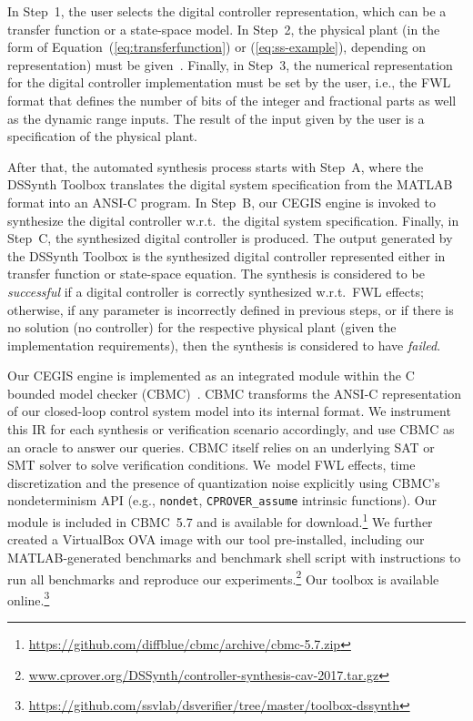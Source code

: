 \documentclass[10pt,conference]{IEEEtran}
\newcommand\tool{{DSSynth Toolbox}\xspace}
\begin{document}
In Step~1, the user selects the digital controller representation, which
can be a transfer function or a state-space model.  In Step~2, the
physical plant (in the form of Equation~(\ref{eq:transferfunction}) or
(\ref{eq:ss-example}), depending on representation) must be
given~\cite{astrom1997computer}.  Finally, in Step~3, the numerical
representation for the digital controller implementation must be set by the
user, i.e., the FWL format that defines the number of bits of the integer
and fractional parts as well as the dynamic range inputs.  The result of the
input given by the user is a specification of the physical plant.

After that, the automated synthesis process starts with Step~A, where the
\tool translates the digital system specification from the MATLAB format
into an ANSI-C program.  In Step~B, our CEGIS engine is invoked to
synthesize the digital controller w.r.t.~the digital system specification. 
Finally, in Step~C, the synthesized digital controller is produced.  The
output generated by the \tool is the synthesized digital controller
represented either in transfer function or state-space equation.  The
synthesis is considered to be \emph{successful} if a digital controller is
correctly synthesized w.r.t.~FWL effects; otherwise, if any parameter is
incorrectly defined in previous steps, or if there is no solution (no
controller) for the respective physical plant (given the implementation
requirements), then the synthesis is considered to have \emph{failed}.

Our CEGIS engine is implemented as an integrated module within the C bounded
model checker (CBMC)~\cite{cbmc}.  CBMC transforms the ANSI-C representation
of our closed-loop control system model into its internal format.  We
instrument this IR for each synthesis or verification scenario accordingly,
and use CBMC as an oracle to answer our queries.  CBMC itself relies on an
underlying SAT or SMT solver to solve verification conditions.  We~model FWL
effects, time discretization and the presence of quantization noise
explicitly using CBMC's nondeterminism API (e.g., \texttt{nondet},
\texttt{CPROVER\_assume} intrinsic functions).  Our module is included in
CBMC~5.7 and is available for
download.\footnote{\url{https://github.com/diffblue/cbmc/archive/cbmc-5.7.zip}}
We further created a VirtualBox OVA image with our tool pre-installed,
including our MATLAB-generated benchmarks and benchmark shell script with
instructions to run all benchmarks and reproduce our
experiments.\footnote{\url{www.cprover.org/DSSynth/controller-synthesis-cav-2017.tar.gz}}
Our toolbox is available
online.\footnote{\url{https://github.com/ssvlab/dsverifier/tree/master/toolbox-dssynth}}
\end{document}
